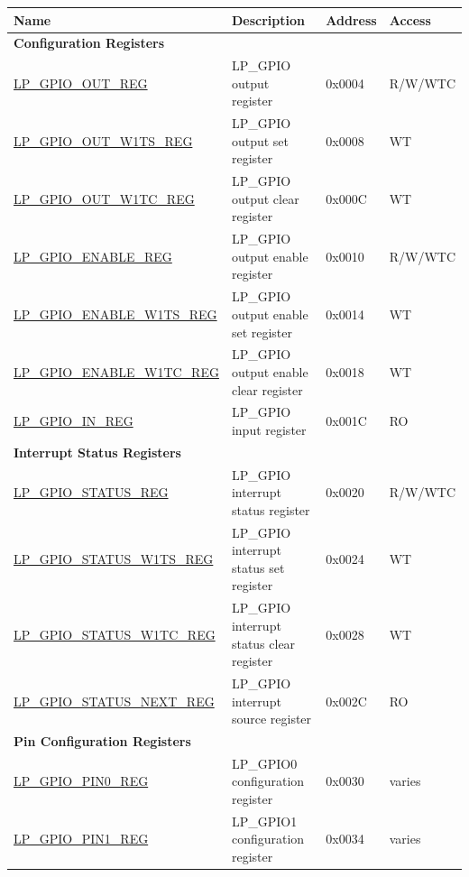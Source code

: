 \begin{longtable}{ | p{6cm} | p{6.5cm} | p{1.3cm} | p{1.7cm} | }
\hline\rowcolor{lightgray}
\textbf{Name} & \textbf{Description} &  \textbf{Address} & \textbf{Access} \\ \hline
\endhead
\multicolumn{4}{|l|}{\textbf{Configuration Registers}} \\ \hline
\hyperref[regdesc:LPGPIOOUTREG]{LP\_GPIO\_OUT\_REG} & LP\_GPIO output register & 0x0004 & R/W/WTC \\ \hline
\hyperref[regdesc:LPGPIOOUTW1TSREG]{LP\_GPIO\_OUT\_W1TS\_REG} & LP\_GPIO output set register & 0x0008 & WT \\ \hline
\hyperref[regdesc:LPGPIOOUTW1TCREG]{LP\_GPIO\_OUT\_W1TC\_REG} & LP\_GPIO output clear register & 0x000C & WT \\ \hline
\hyperref[regdesc:LPGPIOENABLEREG]{LP\_GPIO\_ENABLE\_REG} & LP\_GPIO output enable register & 0x0010 & R/W/WTC \\ \hline
\hyperref[regdesc:LPGPIOENABLEW1TSREG]{LP\_GPIO\_ENABLE\_W1TS\_REG} & LP\_GPIO output enable set register & 0x0014 & WT \\ \hline
\hyperref[regdesc:LPGPIOENABLEW1TCREG]{LP\_GPIO\_ENABLE\_W1TC\_REG} & LP\_GPIO output enable clear register & 0x0018 & WT \\ \hline
\hyperref[regdesc:LPGPIOINREG]{LP\_GPIO\_IN\_REG} & LP\_GPIO input register & 0x001C & RO \\ \hline
\multicolumn{4}{|l|}{\textbf{Interrupt Status Registers}} \\ \hline
\hyperref[regdesc:LPGPIOSTATUSREG]{LP\_GPIO\_STATUS\_REG} & LP\_GPIO interrupt status register & 0x0020 & R/W/WTC \\ \hline
\hyperref[regdesc:LPGPIOSTATUSW1TSREG]{LP\_GPIO\_STATUS\_W1TS\_REG} & LP\_GPIO interrupt status set register & 0x0024 & WT \\ \hline
\hyperref[regdesc:LPGPIOSTATUSW1TCREG]{LP\_GPIO\_STATUS\_W1TC\_REG} & LP\_GPIO interrupt status clear register & 0x0028 & WT \\ \hline
\hyperref[regdesc:LPGPIOSTATUSNEXTREG]{LP\_GPIO\_STATUS\_NEXT\_REG} & LP\_GPIO interrupt source register & 0x002C & RO \\ \hline
\multicolumn{4}{|l|}{\textbf{Pin Configuration Registers}} \\ \hline
\hyperref[regdesc:LPGPIOPINNREG]{LP\_GPIO\_PIN0\_REG} & LP\_GPIO0 configuration register & 0x0030 & varies \\ \hline
\hyperref[regdesc:LPGPIOPINNREG]{LP\_GPIO\_PIN1\_REG} & LP\_GPIO1 configuration register & 0x0034 & varies \\ \hline

\end{longtable}
